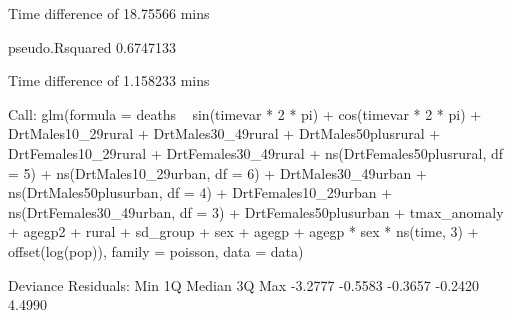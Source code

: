 \documentclass[a4paper]{article}                %
\begin{document}
\begin{Schunk}
\begin{Soutput}
Time difference of 18.75566 mins
\end{Soutput}
\begin{Soutput}
pseudo.Rsquared 
      0.6747133 
\end{Soutput}
\begin{Soutput}
Time difference of 1.158233 mins
\end{Soutput}
\begin{Soutput}
Call:
glm(formula = deaths ~ sin(timevar * 2 * pi) + cos(timevar * 
    2 * pi) + DrtMales10_29rural + DrtMales30_49rural + DrtMales50plusrural + 
    DrtFemales10_29rural + DrtFemales30_49rural + ns(DrtFemales50plusrural, 
    df = 5) + ns(DrtMales10_29urban, df = 6) + DrtMales30_49urban + 
    ns(DrtMales50plusurban, df = 4) + DrtFemales10_29urban + 
    ns(DrtFemales30_49urban, df = 3) + DrtFemales50plusurban + 
    tmax_anomaly + agegp2 + rural + sd_group + sex + agegp + 
    agegp * sex * ns(time, 3) + offset(log(pop)), family = poisson, 
    data = data)

Deviance Residuals: 
    Min       1Q   Median       3Q      Max  
-3.2777  -0.5583  -0.3657  -0.2420   4.4990  


\end{Soutput}
\end{Schunk}
\end{document}
